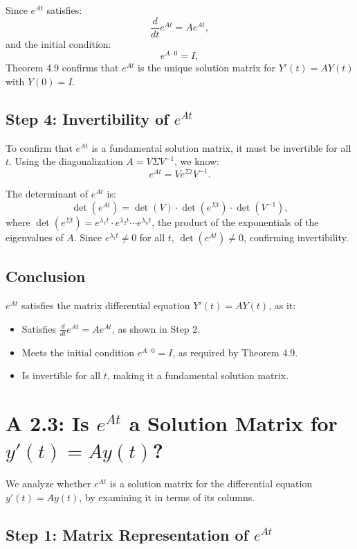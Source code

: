 \documentclass[12pt]{article}
\begin{document}
Since \(e^{At}\) satisfies:
\[
\frac{d}{dt} e^{At} = A e^{At},
\]
and the initial condition:
\[
e^{A \cdot 0} = I,
\]
Theorem 4.9 confirms that \(e^{At}\) is the unique solution matrix for \(Y'(t) = AY(t)\) with \(Y(0) = I\).

\subsection*{Step 4: Invertibility of \(e^{At}\)}

To confirm that \(e^{At}\) is a fundamental solution matrix, it must be invertible for all \(t\). Using the diagonalization \(A = V \Sigma V^{-1}\), we know:
\[
e^{At} = V e^{\Sigma t} V^{-1}.
\]

The determinant of \(e^{At}\) is:
\[
\det(e^{At}) = \det(V) \cdot \det(e^{\Sigma t}) \cdot \det(V^{-1}),
\]
where \(\det(e^{\Sigma t}) = e^{\lambda_1 t} \cdot e^{\lambda_2 t} \cdots e^{\lambda_n t}\), the product of the exponentials of the eigenvalues of \(A\). Since \(e^{\lambda_i t} \neq 0\) for all \(t\), \(\det(e^{At}) \neq 0\), confirming invertibility.

\subsection*{Conclusion}

\(e^{At}\) satisfies the matrix differential equation \(Y'(t) = AY(t)\), as it:
\begin{itemize}
    \item Satisfies \(\frac{d}{dt} e^{At} = A e^{At}\), as shown in Step 2.
    \item Meets the initial condition \(e^{A \cdot 0} = I\), as required by Theorem 4.9.
    \item Is invertible for all \(t\), making it a fundamental solution matrix.
\end{itemize}

\section*{A 2.3: Is \(e^{At}\) a Solution Matrix for \(y'(t) = Ay(t)\)?}

We analyze whether \(e^{At}\) is a solution matrix for the differential equation \(y'(t) = Ay(t)\), by examining it in terms of its columns.

\subsection*{Step 1: Matrix Representation of \(e^{At}\)}
\end{document}
